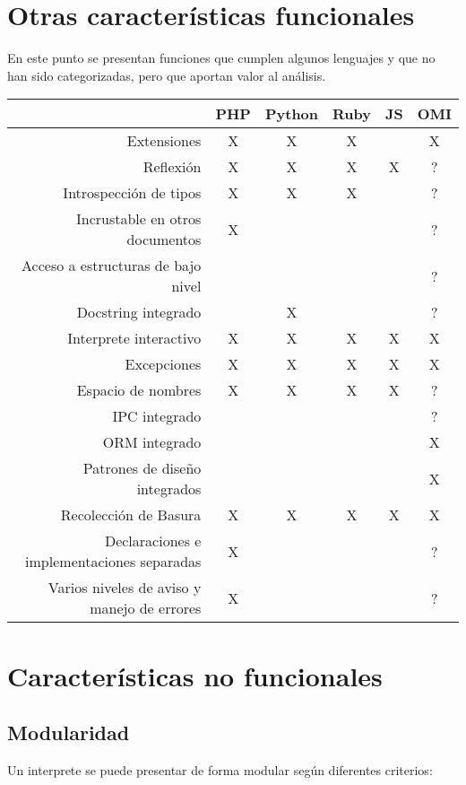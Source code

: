 \section{Otras características funcionales}
En este punto se presentan funciones que cumplen algunos lenguajes
y que no han sido categorizadas, pero que aportan 
valor al análisis.

\FloatBarrier
\begin{table}[h]
\begin{center}
 
\begin{tabular}{|r|c|c|c|c|c|} \hline
 & PHP  & Python & Ruby & JS & OMI\\ \hline
Extensiones & X & X & X &   & X \\ \hline
Reflexión & X & X & X & X & ? \\ \hline
Introspección de tipos & X & X & X & & ? \\ \hline
Incrustable en otros documentos & X &  & & & ? \\ \hline
Acceso a estructuras de bajo nivel &  &  &  &  & ? \\ \hline
Docstring integrado &  & X &   &  & ? \\ \hline
Interprete interactivo & X & X & X & X & X \\ \hline
Excepciones  & X & X & X & X & X \\ \hline
Espacio de nombres & X & X & X & X & ? \\ \hline
IPC integrado &  &  &  &  & ? \\ \hline
ORM integrado & & & & & X \\ \hline
Patrones de diseño integrados & & & & & X \\ \hline
Recolección de Basura & X & X & X & X & X \\ \hline 
Declaraciones e implementaciones separadas & X & & & & ? \\ \hline
Varios niveles de aviso y manejo de errores & X & & & & ? \\ \hline
\end{tabular}
\end{center}
\end{table}
\FloatBarrier

\section {Características no funcionales}
\subsection{Modularidad}
Un interprete se puede presentar de forma modular según diferentes criterios:

